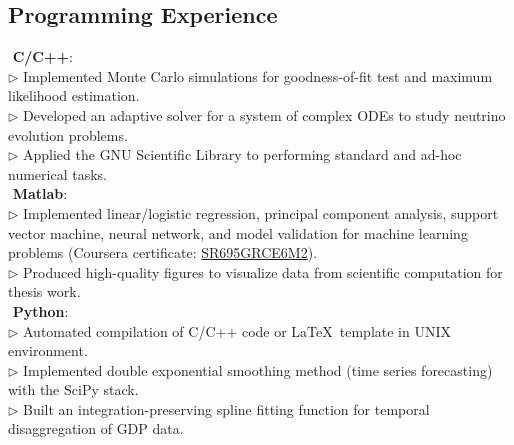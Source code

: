 \documentclass[10pt]{res}
\begin{document}
\begin{resume}
\section{Programming Experience}
\textbullet\,\,{\bf C/C++}: \\ 
$\triangleright$ Implemented Monte Carlo simulations for goodness-of-fit test and maximum likelihood estimation.\\
$\triangleright$ Developed an adaptive solver for a system of complex ODEs to study neutrino evolution problems.\\
$\triangleright$ Applied the GNU Scientific Library to performing standard and ad-hoc numerical tasks.\\
\textbullet\,\,{\bf Matlab}:\\
$\triangleright$ Implemented linear/logistic regression, principal component analysis, support vector machine, neural network, and model validation for machine learning problems (Coursera certificate: 
\href{https://www.coursera.org/account/accomplishments/verify/SR695GRCE6M2}{SR695GRCE6M2}).\\
$\triangleright$ Produced high-quality figures to visualize data from scientific computation for thesis work.\\
\textbullet\,\,{\bf Python}:\\
$\triangleright$ Automated compilation of C/C++ code or \LaTeX\, template in UNIX environment.\\
$\triangleright$ Implemented double exponential smoothing method (time series forecasting) with the SciPy stack.\\
$\triangleright$ Built an integration-preserving spline fitting function for temporal disaggregation of GDP data.
\vspace{-0.15 in}

\end{resume}
\end{document}
